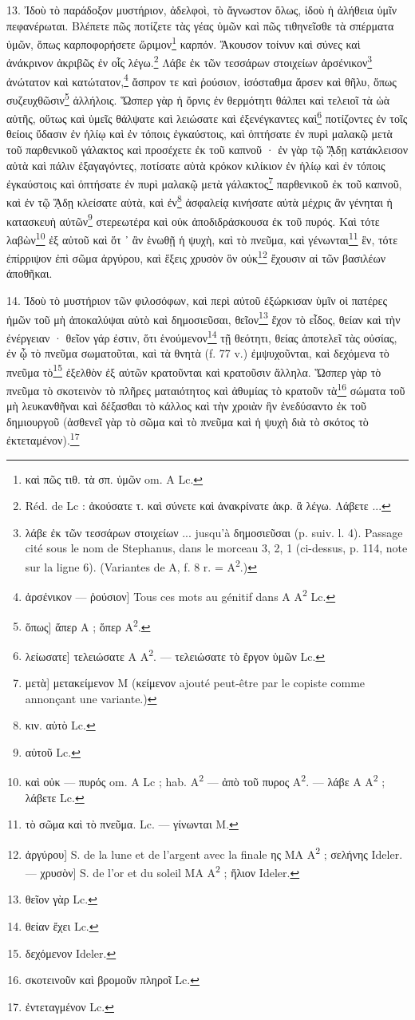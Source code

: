 \documentclass[a4paper, 11pt, oneside, polutonikogreek, french]{article}
\begin{document}
13. Ἰδοὺ τὸ παράδοξον μυστήριον, ἀδελφοὶ, τὸ ἄγνωστον ὅλως, ἰδοὺ ἡ ἀλήθεια ὑμῖν πεφανέρωται. Βλέπετε πῶς ποτίζετε τὰς γέας ὑμῶν καὶ πῶς τιθηνεῖσθε τὰ σπέρματα ὑμῶν, ὅπως καρποφορήσετε ὥριμον\footnote{καὶ πῶς τιθ. τὰ σπ. ὑμῶν om. A Lc.} καρπόν. Ἄκουσον τοίνυν καὶ σύνες καὶ ἀνάκρινον ἀκριβῶς ἐν οἷς λέγω.\footnote{Réd. de Lc : ἀκούσατε τ. καὶ σύνετε καὶ ἀνακρίνατε ἀκρ. ἃ λέγω. Λάβετε ...} Λάβε ἐκ τῶν τεσσάρων στοιχείων ἀρσένικον\footnote{λάβε ἐκ τῶν τεσσάρων στοιχείων ... jusqu'à δημοσιεῦσαι (p. suiv. l. 4). Passage cité sous le nom de Stephanus, dans le morceau 3, 2, 1 (ci-dessus, p. 114, note sur la ligne 6). (Variantes de A, f. 8 r. = A\textsuperscript{2}.)} ἀνώτατον καὶ κατώτατον,\footnote{ἀρσένικον --- ῥούσιον] Tous ces mots au génitif dans A A\textsuperscript{2} Lc.} ἄσπρον τε καὶ ῥούσιον, ἰσόσταθμα ἄρσεν καὶ θῆλυ, ὅπως συζευχθῶσιν\footnote{ὅπως] ἅπερ A ; ὅπερ A\textsuperscript{2}.} ἀλλήλοις. Ὥσπερ γὰρ ἡ ὄρνις ἐν θερμότητι θάλπει καὶ τελειοῖ τὰ ὡὰ αὐτῆς, οὕτως καὶ ὑμεῖς θάλψατε καὶ λειώσατε καὶ ἐξενέγκαντες καὶ\footnote{λείωσατε] τελειώσατε A A\textsuperscript{2}. --- τελειώσατε τὸ ἔργον ὑμῶν Lc.} ποτίζοντες ἐν τοῖς θείοις ὕδασιν ἐν ἡλίῳ καὶ ἐν τόποις ἐγκαύστοις, καὶ ὀπτήσατε ἐν πυρὶ μαλακῷ μετὰ τοῦ παρθενικοῦ γάλακτος καὶ προσέχετε ἐκ τοῦ καπνοῦ · ἐν γὰρ τῷ ᾍδῃ κατάκλεισον αὐτὰ καὶ πάλιν ἐξαγαγόντες, ποτίσατε αὐτὰ κρόκον κιλίκιον ἐν ἡλίῳ καὶ ἐν τόποις ἐγκαύστοις καὶ ὀπτήσατε ἐν πυρὶ μαλακῷ μετὰ γάλακτος\footnote{μετὰ] μετακείμενον M (κείμενον ajouté peut-être par le copiste comme annonçant une variante.)} παρθενικοῦ ἐκ τοῦ καπνοῦ, καὶ ἐν τῷ ᾍδῃ κλείσατε αὐτὰ, καὶ ἐν\footnote{κιν. αὐτὸ Lc.} ἀσφαλείᾳ κινήσατε αὐτὰ μέχρις ἂν γένηται ἡ κατασκευὴ αὐτῶν\footnote{αὐτοῦ Lc.} στερεωτέρα καὶ οὐκ ἀποδιδράσκουσα ἐκ τοῦ πυρός. Καὶ τότε λαβὼν\footnote{καὶ οὐκ --- πυρός om. A Lc ; hab. A\textsuperscript{2} --- ἀπὸ τοῦ πυρος A\textsuperscript{2}. --- λάβε A A\textsuperscript{2} ; λάβετε Lc.} ἐξ αὐτοῦ καὶ ὅτ ᾽ ἂν ἑνωθῇ ἡ ψυχὴ, καὶ τὸ πνεῦμα, καὶ γένωνται\footnote{τὸ σῶμα καὶ τὸ πνεῦμα. Lc. --- γίνωνται M.} ἓν, τότε ἐπίρριψον ἐπὶ σῶμα ἀργύρου, καὶ ἕξεις χρυσὸν ὃν οὐκ\footnote{ἀργύρου] S. de la lune et de l'argent avec la finale ης MA A\textsuperscript{2} ; σελήνης Ideler. --- χρυσὸν] S. de l'or et du soleil MA A\textsuperscript{2} ; ἥλιον Ideler.} ἔχουσιν αἱ τῶν βασιλέων ἀποθῆκαι.

14. Ἰδοὺ τὸ μυστήριον τῶν φιλοσόφων, καὶ περὶ αὐτοῦ ἐξώρκισαν ὑμῖν οἱ πατέρες ἡμῶν τοῦ μὴ ἀποκαλύψαι αὐτὸ καὶ δημοσιεῦσαι, θεῖον\footnote{θεῖον γὰρ Lc.} ἔχον τὸ εἶδος, θείαν καὶ τὴν ἐνέργειαν · θεῖον γάρ ἐστιν, ὅτι ἑνούμενον\footnote{θείαν ἔχει Lc.} τῇ θεότητι, θείας ἀποτελεῖ τὰς οὐσίας, ἐν ᾧ τὸ πνεῦμα σωματοῦται, καὶ τὰ θνητὰ (f. 77 v.) ἐμψυχοῦνται, καὶ δεχόμενα τὸ πνεῦμα τὸ\footnote{δεχόμενον Ideler.} ἐξελθὸν ἐξ αὐτῶν κρατοῦνται καὶ κρατοῦσιν ἄλληλα. Ὥσπερ γὰρ τὸ πνεῦμα τὸ σκοτεινὸν τὸ πλῆρες ματαιότητος καὶ ἀθυμίας τὸ κρατοῦν τὰ\footnote{σκοτεινοῦν καὶ βρομοῦν πληροῖ Lc.} σώματα τοῦ μὴ λευκανθῆναι καὶ δέξασθαι τὸ κάλλος καὶ τὴν χροιὰν ἣν ἐνεδύσαντο ἐκ τοῦ δημιουργοῦ (ἀσθενεῖ γὰρ τὸ σῶμα καὶ τὸ πνεῦμα καὶ ἡ ψυχὴ διὰ τὸ σκότος τὸ ἐκτεταμένον).\footnote{ἐντεταγμένον Lc.}
\end{document}
